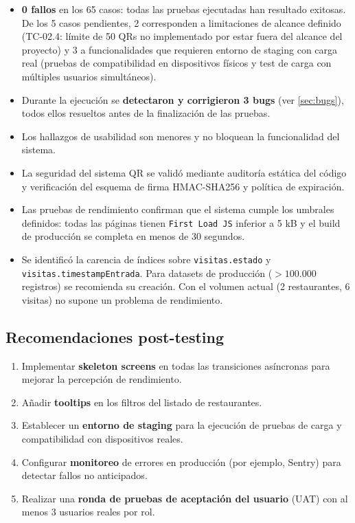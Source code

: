 \begin{itemize}
    \item \textbf{0 fallos} en los 65 casos: todas las pruebas ejecutadas han resultado exitosas. De los 5 casos pendientes, 2 corresponden a limitaciones de alcance definido (TC-02.4: límite de 50 QRs no implementado por estar fuera del alcance del proyecto) y 3 a funcionalidades que requieren entorno de staging con carga real (pruebas de compatibilidad en dispositivos físicos y test de carga con múltiples usuarios simultáneos).
    \item Durante la ejecución se \textbf{detectaron y corrigieron 3 bugs} (ver \ref{sec:bugs}), todos ellos resueltos antes de la finalización de las pruebas.
    \item Los hallazgos de usabilidad son menores y no bloquean la funcionalidad del sistema.
    \item La seguridad del sistema QR se validó mediante auditoría estática del código y verificación del esquema de firma HMAC-SHA256 y política de expiración.
    \item Las pruebas de rendimiento confirman que el sistema cumple los umbrales definidos: todas las páginas tienen \texttt{First Load JS} inferior a 5 kB y el build de producción se completa en menos de 30 segundos.
    \item Se identificó la carencia de índices sobre \texttt{visitas.estado} y \texttt{visitas.timestampEntrada}. Para datasets de producción ($>100.000$ registros) se recomienda su creación. Con el volumen actual (2 restaurantes, 6 visitas) no supone un problema de rendimiento.
\end{itemize}

\subsection{Recomendaciones post-testing}

\begin{enumerate}
    \item Implementar \textbf{skeleton screens} en todas las transiciones asíncronas para mejorar la percepción de rendimiento.
    \item Añadir \textbf{tooltips} en los filtros del listado de restaurantes.
    \item Establecer un \textbf{entorno de staging} para la ejecución de pruebas de carga y compatibilidad con dispositivos reales.
    \item Configurar \textbf{monitoreo} de errores en producción (por ejemplo, Sentry) para detectar fallos no anticipados.
    \item Realizar una \textbf{ronda de pruebas de aceptación del usuario} (UAT) con al menos 3 usuarios reales por rol.
\end{enumerate}

